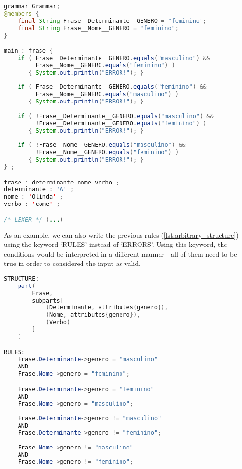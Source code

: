 \begin{center}
\begin{minipage}{13cm}
\begin{lstlisting}[language=java, basicstyle=\small, label={lst:case_study_sentence2}, caption=Example of another specific generated grammar.]
grammar Grammar;
@members {
    final String Frase__Determinante__GENERO = "feminino";
    final String Frase__Nome__GENERO = "feminino";
}

main : frase {
    if ( Frase__Determinante__GENERO.equals("masculino") &&
         Frase__Nome__GENERO.equals("feminino") ) 
       { System.out.println("ERROR!"); }
	
    if ( Frase__Determinante__GENERO.equals("feminino") &&
         Frase__Nome__GENERO.equals("masculino") ) 
       { System.out.println("ERROR!"); }
	
    if ( !Frase__Determinante__GENERO.equals("masculino") &&
         !Frase__Determinante__GENERO.equals("feminino") ) 
       { System.out.println("ERROR!"); }
	
    if ( !Frase__Nome__GENERO.equals("masculino") &&
         !Frase__Nome__GENERO.equals("feminino") )
       { System.out.println("ERROR!"); }
} ;

frase : determinante nome verbo ;
determinante : 'A' ;
nome : 'Olinda' ;
verbo : 'come' ;

/* LEXER */ (...)
\end{lstlisting}
\end{minipage}
\end{center}

As an example, we can also write the previous rules (\autoref{lst:arbitrary_structure}) using the keyword `RULES' instead of `ERRORS'.
Using this keyword, the conditions would be interpreted in a different manner - all of them need to be true in order to considered the input as valid.

\begin{center}
\begin{minipage}{11cm}
\begin{lstlisting}[language=java, basicstyle=\small, label={lst:arbitrary_structure_rules}, caption=Example of an arbitrary sentence structure with rules]
STRUCTURE:
    part(
        Frase,
        subparts[
            (Determinante, attributes{genero}),
            (Nome, attributes{genero}),
            (Verbo)
        ]
    )

RULES:
    Frase.Determinante->genero = "masculino" 
    AND
    Frase.Nome->genero = "feminino";

    Frase.Determinante->genero = "feminino" 
    AND
    Frase.Nome->genero = "masculino";
    
    Frase.Determinante->genero != "masculino"
    AND 
    Frase.Determinante->genero != "feminino";
    
    Frase.Nome->genero != "masculino" 
    AND 
    Frase.Nome->genero != "feminino";
\end{lstlisting}
\end{minipage}
\end{center}

